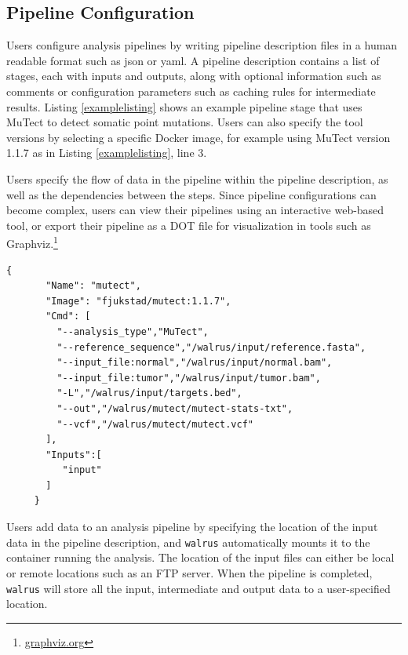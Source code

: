 \subsection{Pipeline Configuration}
Users configure analysis pipelines by writing pipeline description files in a
human readable format such as \gls{json} or \gls{yaml}. A pipeline description
contains a list of stages, each with inputs and outputs, along with optional
information such as comments or configuration parameters such as caching rules
for intermediate results. Listing \ref{examplelisting} shows an example pipeline
stage that uses MuTect\cite{mutect} to detect somatic point mutations. Users
can also specify the tool versions by selecting a specific Docker image, for
example using MuTect version 1.1.7 as in Listing \ref{examplelisting}, line 3. 

Users specify the flow of data in the pipeline within the pipeline description,
as well as the dependencies between the steps. Since pipeline configurations can
become complex, users can view their pipelines using an interactive web-based
tool, or export their pipeline as a DOT file for visualization in tools such as
Graphviz.\footnote{\url{graphviz.org}}

\begin{lstlisting}[caption={Example pipeline stage for a tool that detects
somatic point mutations. It reads a reference sequence file together with both
tumor and normal sequences, and produces an output file with the detected
mutations.},
label={examplelisting}, 
basicstyle=\ttfamily\scriptsize]
     {
       "Name": "mutect",
       "Image": "fjukstad/mutect:1.1.7",
       "Cmd": [
         "--analysis_type","MuTect",
         "--reference_sequence","/walrus/input/reference.fasta",
         "--input_file:normal","/walrus/input/normal.bam",
         "--input_file:tumor","/walrus/input/tumor.bam",
         "-L","/walrus/input/targets.bed",
         "--out","/walrus/mutect/mutect-stats-txt",
         "--vcf","/walrus/mutect/mutect.vcf"
       ],
       "Inputs":[
          "input" 
       ]
     }
\end{lstlisting}

Users add data to an analysis pipeline by specifying the location of the
input data in the pipeline description, and \texttt{walrus} automatically mounts
it to the container running the analysis. The location of the input files can
either be local or remote locations such as an FTP server. When the pipeline is
completed, \texttt{walrus} will store all the input, intermediate and output
data to a user-specified location.  


